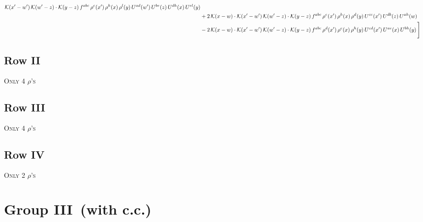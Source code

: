 \documentclass[9pt]{article}
\numberwithin{equation}{section}
\begin{document}
\begin{align}
\mathcal{K}(x'-w')\, \mathcal{K}(w'-z)\cdot \mathcal{K}(y-z)\, f^{abc}\,\rho^{c}(x')\,\rho^{h}(x)\,\rho^{l}(y)\,U^{ad}(w')\,U^{be}(z)\,U^{dh}(x)\,U^{el}(y)\notag \\ & +2\, \mathcal{K}(x-w)\cdot \mathcal{K}(x'-w')\, \mathcal{K}(w'-z)\cdot \mathcal{K}(y-z)\, f^{abc}\,\rho^{e}(x')\,\rho^{h}(x)\,\rho^{d}(y)\,U^{ce}(x')\,U^{db}(z)\,U^{ah}(w)\notag \\ &  -2\, \mathcal{K}(x-w)\cdot \mathcal{K}(x'-w')\, \mathcal{K}(w'-z)\cdot \mathcal{K}(y-z)\, f^{abc}\,\rho^{d}(x')\,\rho^{e}(x)\,\rho^{h}(y)\,U^{cd}(x')\,U^{ae}(x)\,U^{bh}(y)\,\Bigg]
\end{align}
\subsection{Row II}
\textsc{Only 4 $\rho$'s}
\subsection{Row III}
\textsc{Only 4 $\rho$'s}
\subsection{Row IV}
\textsc{Only 2 $\rho$'s}
\section{Group III\, (with c.c.)}
\end{document}
